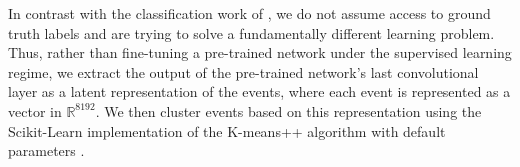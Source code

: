 \documentclass[review,number,sort&compress]{elsarticle}
\newcommand{\R}{\mathbb{R}}
\begin{document}

In contrast with the classification work of \citet{Kuchera2019}, we do not assume access to ground truth labels and are trying to solve a fundamentally different learning problem. Thus, rather than fine-tuning a pre-trained network under the supervised learning regime, we extract the output of the pre-trained network's last convolutional layer as a latent representation of the events, where each event is represented as a vector in $\R^{8192}$. We then cluster events based on this representation using the Scikit-Learn implementation of the K-means++ algorithm with default parameters \cite{Pedregosa2011}.


\end{document}
